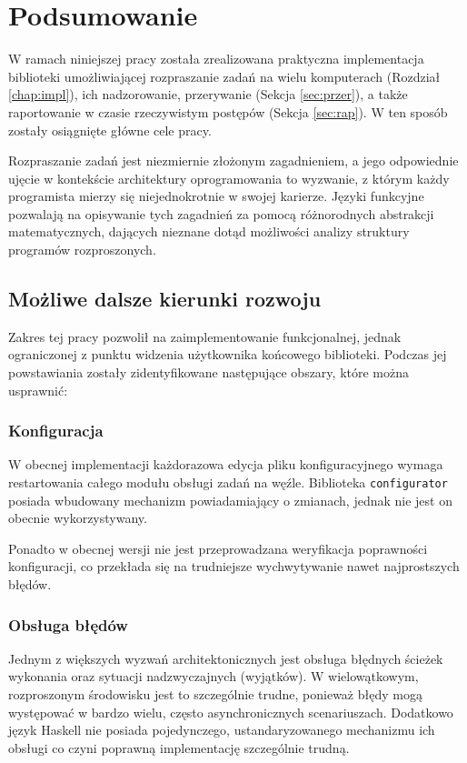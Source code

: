 \chapter{Podsumowanie}
\label{chap:pods}
W ramach niniejszej pracy została zrealizowana praktyczna implementacja biblioteki umożliwiającej rozpraszanie zadań na wielu komputerach (Rozdział \ref{chap:impl}), ich nadzorowanie, przerywanie (Sekcja \ref{sec:przer}), a także raportowanie w czasie rzeczywistym postępów (Sekcja \ref{sec:rap}). W ten sposób zostały osiągnięte główne cele pracy.

Rozpraszanie zadań jest niezmiernie złożonym zagadnieniem, a jego odpowiednie ujęcie w kontekście architektury oprogramowania to wyzwanie, z którym każdy programista mierzy się niejednokrotnie w swojej karierze. Języki funkcyjne pozwalają na opisywanie tych zagadnień za pomocą różnorodnych abstrakcji matematycznych, dających nieznane dotąd możliwości analizy struktury programów rozproszonych.

\section{Możliwe dalsze kierunki rozwoju}
Zakres tej pracy pozwolił na zaimplementowanie funkcjonalnej, jednak ograniczonej z punktu widzenia użytkownika końcowego biblioteki. Podczas jej powstawiania zostały zidentyfikowane następujące obszary, które można usprawnić:
\subsection*{Konfiguracja}
W obecnej implementacji każdorazowa edycja pliku konfiguracyjnego wymaga restartowania całego modułu obsługi zadań na węźle. Biblioteka \lstinline{configurator} posiada wbudowany mechanizm powiadamiający o zmianach, jednak nie jest on obecnie wykorzystywany.

Ponadto w obecnej wersji nie jest przeprowadzana weryfikacja poprawności konfiguracji, co przekłada się na trudniejsze wychwytywanie nawet najprostszych błędów.

\subsection*{Obsługa błędów}
Jednym z większych wyzwań architektonicznych jest obsługa błędnych ścieżek wykonania oraz sytuacji nadzwyczajnych (wyjątków). W wielowątkowym, rozproszonym środowisku jest to szczególnie trudne, ponieważ błędy mogą występować w bardzo wielu, często asynchronicznych scenariuszach. Dodatkowo język Haskell nie posiada pojedynczego, ustandaryzowanego mechanizmu ich obsługi co czyni poprawną implementację szczególnie trudną.

